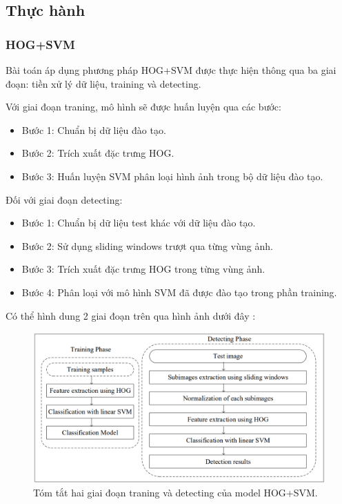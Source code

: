 \subsection{Thực hành}
\subsubsection{HOG+SVM}
Bài toán áp dụng phương pháp HOG+SVM được thực hiện thông qua ba giai đoạn: tiền xử lý dữ liệu, training và detecting.

Với giai đoạn traning, mô hình sẽ được huấn luyện qua các bước:
\begin{itemize}[noitemsep, topsep=0pt, leftmargin=1.25em, label={$-$}]
    \item Bước 1: Chuẩn bị dữ liệu đào tạo.
    \item Bước 2: Trích xuất đặc trưng HOG.
    \item Bước 3: Huấn luyện SVM phân loại hình ảnh trong bộ dữ liệu đào tạo.
\end{itemize}

Đối với giai đoạn detecting:
\begin{itemize}[noitemsep, topsep=0pt, leftmargin=1.25em, label={$-$}]
    \item Bước 1: Chuẩn bị dữ liệu test khác với dữ liệu đào tạo.
    \item Bước 2: Sử dụng sliding windows trượt qua từng vùng ảnh.
    \item Bước 3: Trích xuất đặc trưng HOG trong từng vùng ảnh.
    \item Bước 4: Phân loại với mô hình SVM đã được đào tạo trong phần training.
\end{itemize}

Có thể hình dung 2 giai đoạn trên qua hình ảnh dưới đây \cite{HOG&SVMped}:   
\graphicspath{{figures/}}
\begin{figure}[h!]
  \centering
  \includegraphics[scale=0.4]{graphics/detectingphaseofHOGSVM.png}
  \caption{Tóm tắt hai giai đoạn traning và detecting của model HOG+SVM.}
\end{figure}


